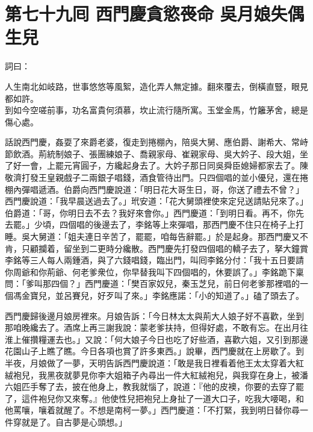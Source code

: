 
\chapter*{第七十九囘 西門慶貪慾䘮命 吳月娘失偶生兒}


詞曰：

\begin{myquote} 
人生南北如岐路，世事悠悠等風絮，造化弄人無定據。翻來覆去，倒橫直豎，眼見都如許。\\
到如今空嗟前事，功名富貴何須慕，坎止流行隨所寓。玉堂金馬，竹籬茅舍，總是傷心處。

\end{myquote} 

話說西門慶，姦耍了來爵老婆，復走到捲棚內，陪吳大舅、應伯爵、謝希大、常峙節飲酒。荊統制娘子、張團練娘子、喬親家母、崔親家母、吳大妗子、段大姐，坐了好一會，上罷元宵圓子，方纔起身去了。大妗子那日同吳舜臣媳婦都家去了。陳敬濟打發王皇親戲子二兩銀子唱錢，酒食管待出門。只四個唱的並小優兒，還在捲棚內彈唱遞酒。伯爵向西門慶說道：「明日花大哥生日，哥，你送了禮去不曾？」西門慶說道：「我早晨送過去了。」玳安道：「花大舅頭裡使來定兒送請貼兒來了。」伯爵道：「哥，你明日去不去？我好來會你。」西門慶道：「到明日看。再不，你先去罷。」少頃，四個唱的後邊去了，李銘等上來彈唱，那西門慶不住只在椅子上打睡。{}吳大舅道：「姐夫連日辛苦了，罷罷，咱每告辭罷。」於是起身。那西門慶又不肯，只顧攔着，留坐到二更時分纔散。西門慶先打發四個唱的轎子去了，拏大鐘賞李銘等三人每人兩鍾酒，與了六錢唱錢，臨出門，叫囘李銘分付：「我十五日要請你周爺和你荊爺、何老爹衆位，你早替我叫下四個唱的，休要誤了。」李銘跪下稟問：「爹叫那四個？」西門慶道：「樊百家奴兒，秦玉芝兒，前日何老爹那裡唱的一個馮金寶兒，{}並呂賽兒，好歹叫了來。」李銘應諾：「小的知道了。」磕了頭去了。

西門慶歸後邊月娘房裡來。月娘告訴：「今日林太太與荊大人娘子好不喜歡，坐到那咱晚纔去了。酒席上再三謝我說：蒙老爹扶持，但得好處，不敢有忘。在出月往淮上催攢糧運去也。」又說：「何大娘子今日也吃了好些酒，喜歡六姐，又引到那邊花園山子上瞧了瞧。今日各項也賞了許多東西。」說畢，西門慶就在上房歇了。到半夜，月娘做了一夢，{}天明告訴西門慶說道：「敢是我日裡看着他王太太穿着大紅絨袍兒，我黑夜就夢見你李大姐箱子內尋出一件大紅絨袍兒，與我穿在身上，被潘六姐匹手奪了去，披在他身上，教我就惱了，說道：『他的皮襖，你要的去穿了罷了，這件袍兒你又來奪。』{}他使性兒把袍兒上身扯了一道大口子，吃我大喓喝，和他罵嚷，嚷着就醒了。不想是南柯一夢。」西門慶道：「不打緊，我到明日替你尋一件穿就是了。自古夢是心頭想。」

